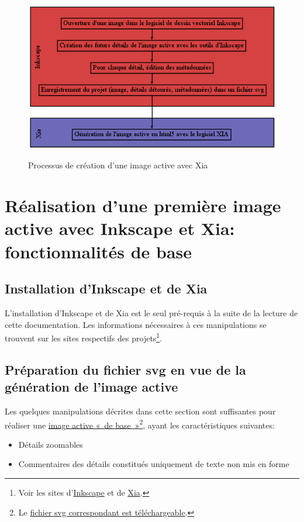 \documentclass[a4paper,12pt]{report}
\begin{document}
\begin{figure}[htp]
 \centering
 \caption{Processus de création d'une image active avec Xia}
 \includegraphics[width=1\textwidth]{images/workflow_xia}
 \label{workflow_xia}
\end{figure}

\section{Réalisation d'une première image active avec Inkscape et Xia: fonctionnalités de base}

\subsection{Installation d'Inkscape et de Xia}

L'installation d'Inkscape et de Xia est le seul pré-requis à la suite de la lecture de cette documentation.
Les informations nécessaires à ces manipulations se trouvent sur les sites respectifs des projets\footnote{Voir les sites d'\href{http://www.inkscape.org/}{Inkscape} et de \href{http://images-actives.crdp-versailles.fr/beta/}{Xia}.}.

\subsection{Préparation du fichier svg en vue de la génération de l'image active}\label{preparation_svg}

Les quelques manipulations décrites dans cette section sont suffisantes
pour réaliser une \href{http://geoffrey-gekiere.ac-versailles.fr/xia1}{image active «~de base~»}\footnote{Le 
\href{http://geoffrey-gekiere.ac-versailles.fr/xia1/svg/xia1.svg}{fichier svg correspondant est téléchargeable}.}, 
ayant les caractéristiques suivantes:
\begin{itemize}
 \item Détails zoomables
 \item Commentaires des détails constitués uniquement de texte non mis en forme
\end{itemize}
\end{document}
